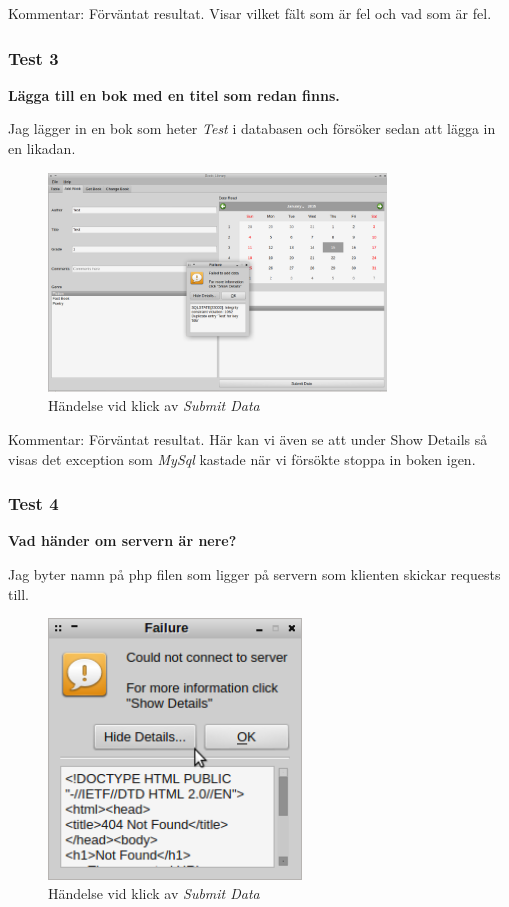 \documentclass[11pt, titlepage, oneside, a4paper]{article}
\begin{document}
        Kommentar: Förväntat resultat. Visar vilket fält som är fel och vad som är fel.
        
        \clearpage
        \subsubsection{Test 3}
        \textbf{Lägga till en bok med en titel som redan finns.}
        
        Jag lägger in en bok som heter \emph{Test} i databasen och försöker sedan att lägga in en likadan.
         \begin{figure}[h!]
        \includegraphics[width=0.8\textwidth]{test_3}
        \caption{Händelse vid klick av \emph{Submit Data}}
        \label{fig:start}
        \end{figure}
        
        Kommentar: Förväntat resultat. Här kan vi även se att under Show Details så visas det exception som \emph{MySql} kastade när vi försökte stoppa in boken igen.
        
        \clearpage
        
        \subsubsection{Test 4}
        \textbf{Vad händer om servern är nere?}
        
        Jag byter namn på php filen som ligger på servern som klienten skickar requests till.
        
        \begin{figure}[h!]
        \includegraphics[width=0.6\textwidth]{test_4}
        \caption{Händelse vid klick av \emph{Submit Data}}
        \label{fig:start}
        \end{figure}
        
\end{document}
